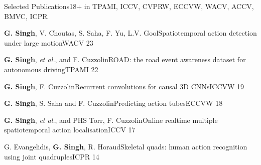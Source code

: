 \documentclass{resume_short} %
\begin{document}
\vspace{0.1in}
\begin{rSection}{Selected Publications}{18+\footnotesize{ in TPAMI, ICCV, CVPRW, ECCVW, WACV, ACCV, BMVC, ICPR}}
  \begin{pSubsection}{\textbf{G. Singh}, V. Choutas, S. Saha, F. Yu, L.V. Gool}{Spatiotemporal action detection under large motion}{WACV}{ 23}\end{pSubsection}
  \begin{pSubsection}{\textbf{G. Singh}, \textit{et al.}, and
    F. Cuzzolin}{ROAD: the road event awareness dataset for autonomous driving}{TPAMI}{ 22}\end{pSubsection}
  \begin{pSubsection}{\textbf{G. Singh}, F. Cuzzolin}{Recurrent convolutions for causal 3D CNNs}{ICCVW}{ 19}\end{pSubsection}
  \begin{pSubsection}{\textbf{G. Singh}, S. Saha and F. Cuzzolin}{Predicting action tubes}{ECCVW}{ 18}\end{pSubsection}
  \begin{pSubsection}{\textbf{G. Singh}, \textit{et al.}, and PHS Torr, F. Cuzzolin}{Online realtime multiple spatiotemporal action localisation}{ICCV}{ 17}\end{pSubsection}
  \begin{pSubsection}{G. Evangelidis, \textbf{G. Singh}, R. Horaud}{Skeletal quads: human action recognition using joint quadruples}{ICPR}{ 14}\end{pSubsection}
  
  \end{rSection}
\end{document}
